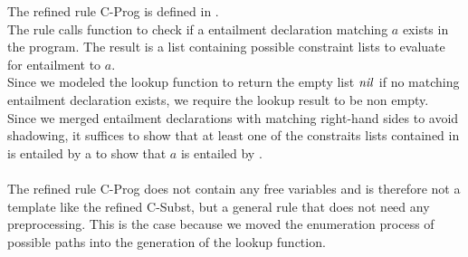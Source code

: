 %
The refined rule C-Prog is defined in .\\
The rule calls function  to check
if a entailment declaration matching $a$ exists in the program.
The result is a list containing possible constraint lists
to evaluate for entailment to $a$.\\
Since we modeled the lookup function to return the empty list $\mathit{nil}$
if no matching entailment declaration exists,
we require the lookup result  to be non empty.\\
Since we merged entailment declarations with matching right-hand sides
to avoid shadowing, it suffices to show that at least one
of the constraits lists contained in 
is entailed by \ovl a to show that $a$ is entailed by .\\
\\
The refined rule C-Prog does not contain any free variables
and is therefore not a template like the refined C-Subst,
but a general rule that does not need any preprocessing.
This is the case because we moved the enumeration process
of possible paths into the generation of the lookup function.

